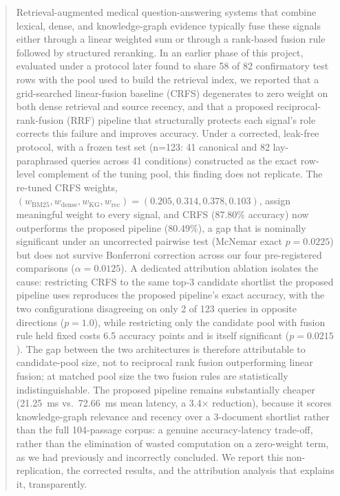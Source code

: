 \documentclass[10pt,conference]{IEEEtran}
\begin{document}
\begin{abstract}
Retrieval-augmented medical question-answering systems that combine lexical, dense, and knowledge-graph evidence typically fuse these signals either through a linear weighted sum or through a rank-based fusion rule followed by structured reranking. In an earlier phase of this project, evaluated under a protocol later found to share 58 of 82 confirmatory test rows with the pool used to build the retrieval index, we reported that a grid-searched linear-fusion baseline (CRFS) degenerates to zero weight on both dense retrieval and source recency, and that a proposed reciprocal-rank-fusion (RRF) pipeline that structurally protects each signal's role corrects this failure and improves accuracy. Under a corrected, leak-free protocol, with a frozen test set (n=123: 41 canonical and 82 lay-paraphrased queries across 41 conditions) constructed as the exact row-level complement of the tuning pool, this finding does not replicate. The re-tuned CRFS weights, $(w_{\text{BM25}}, w_{\text{dense}}, w_{\text{KG}}, w_{\text{rec}}) = (0.205, 0.314, 0.378, 0.103)$, assign meaningful weight to every signal, and CRFS (87.80\% accuracy) now outperforms the proposed pipeline (80.49\%), a gap that is nominally significant under an uncorrected pairwise test (McNemar exact $p=0.0225$) but does not survive Bonferroni correction across our four pre-registered comparisons ($\alpha=0.0125$). A dedicated attribution ablation isolates the cause: restricting CRFS to the same top-3 candidate shortlist the proposed pipeline uses reproduces the proposed pipeline's exact accuracy, with the two configurations disagreeing on only 2 of 123 queries in opposite directions ($p=1.0$), while restricting only the candidate pool with fusion rule held fixed costs 6.5 accuracy points and is itself significant ($p=0.0215$). The gap between the two architectures is therefore attributable to candidate-pool size, not to reciprocal rank fusion outperforming linear fusion; at matched pool size the two fusion rules are statistically indistinguishable. The proposed pipeline remains substantially cheaper (21.25~ms vs.\ 72.66~ms mean latency, a 3.4$\times$ reduction), because it scores knowledge-graph relevance and recency over a 3-document shortlist rather than the full 104-passage corpus: a genuine accuracy-latency trade-off, rather than the elimination of wasted computation on a zero-weight term, as we had previously and incorrectly concluded. We report this non-replication, the corrected results, and the attribution analysis that explains it, transparently.
\end{abstract}
\end{document}
